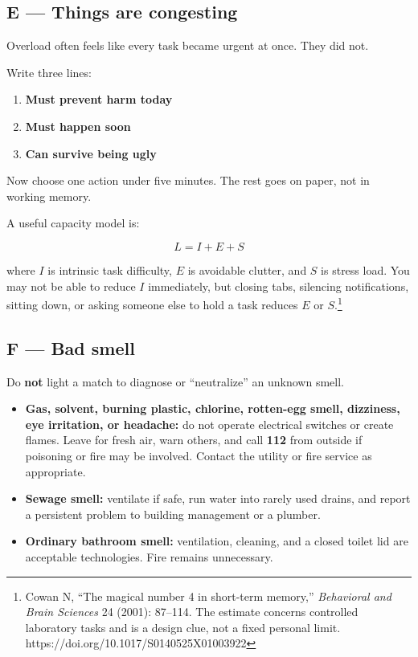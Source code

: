 \hypertarget{e-things-are-congesting}{%
\subsection{E --- Things are congesting}\label{e-things-are-congesting}}

Overload often feels like every task became urgent at once. They did
not.

Write three lines:

\begin{enumerate}
\def\labelenumi{\arabic{enumi}.}
\tightlist
\item
  \textbf{Must prevent harm today}
\item
  \textbf{Must happen soon}
\item
  \textbf{Can survive being ugly}
\end{enumerate}

Now choose one action under five minutes. The rest goes on paper, not in
working memory.

A useful capacity model is:

\[L = I + E + S\]

where \(I\) is intrinsic task difficulty, \(E\) is avoidable clutter,
and \(S\) is stress load. You may not be able to reduce \(I\)
immediately, but closing tabs, silencing notifications, sitting down, or
asking someone else to hold a task reduces \(E\) or \(S\).\footnote{Cowan
  N, ``The magical number 4 in short-term memory,'' \emph{Behavioral and
  Brain Sciences} 24 (2001): 87--114. The estimate concerns controlled
  laboratory tasks and is a design clue, not a fixed personal limit.
  https://doi.org/10.1017/S0140525X01003922}

\hypertarget{f-bad-smell}{%
\subsection{F --- Bad smell}\label{f-bad-smell}}

Do \textbf{not} light a match to diagnose or ``neutralize'' an unknown
smell.

\begin{itemize}
\tightlist
\item
  \textbf{Gas, solvent, burning plastic, chlorine, rotten-egg smell,
  dizziness, eye irritation, or headache:} do not operate electrical
  switches or create flames. Leave for fresh air, warn others, and call
  \textbf{112} from outside if poisoning or fire may be involved.
  Contact the utility or fire service as appropriate.
\item
  \textbf{Sewage smell:} ventilate if safe, run water into rarely used
  drains, and report a persistent problem to building management or a
  plumber.
\item
  \textbf{Ordinary bathroom smell:} ventilation, cleaning, and a closed
  toilet lid are acceptable technologies. Fire remains unnecessary.
\end{itemize}

